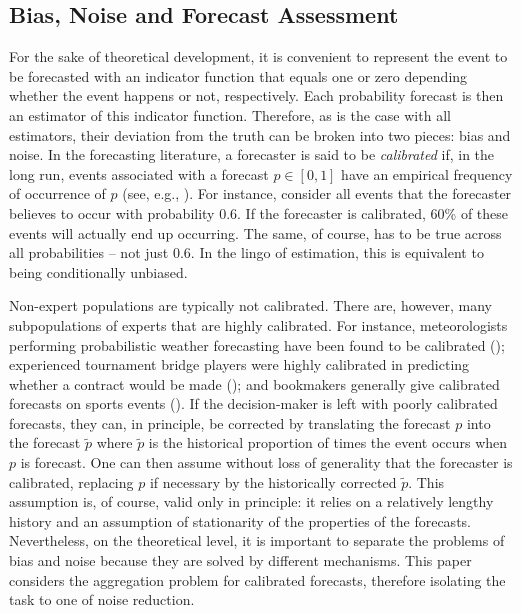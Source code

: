 \documentclass[11pt]{article}
\theoremstyle{definition}
\theoremstyle{definition}
\def\pt{\tilde{p}}
\begin{document}
\subsection{Bias, Noise and Forecast Assessment}
\label{BiasNoise}
For the sake of theoretical development, it is convenient to represent the event to be forecasted with an
indicator function that equals one or zero depending whether the event
happens or not, respectively. Each probability forecast is then an
estimator of this indicator function.  Therefore, as is the case with
all estimators, their deviation from the truth can be broken into two
pieces: bias and noise.  In the forecasting literature, a forecaster
is said to be {\em calibrated} if, in the long run, events associated
with a forecast $p \in [0,1]$ have an empirical frequency of
occurrence of $p$ (see, e.g., \citealt{degroot1983comparison}). For
instance, consider all events that the forecaster believes to occur
with probability 0.6. If the forecaster is calibrated, 60\% of
these events will actually end up occurring. The same, of course, has
to be true across all probabilities -- not just 0.6.  
In the lingo of
estimation, this is equivalent to being conditionally unbiased.

Non-expert populations are typically not calibrated. There are,
however, many subpopulations of experts that are highly
calibrated. For instance, meteorologists performing probabilistic
weather forecasting have been found to be calibrated
(\citealt{murphy1977reliability}); experienced tournament bridge
players were highly calibrated in predicting whether a contract would
be made (\citealt{keren1987facing}); and bookmakers generally give
calibrated forecasts on sports events (\citealt{dowie1976efficiency,
yates1985conditional}). If the decision-maker is left with poorly
calibrated forecasts, they can, in principle, be corrected by
translating the forecast $p$ into the forecast $\pt$ where $\pt$ is
the historical proportion of times the event occurs when $p$ is
forecast.  One can then assume without loss of generality that the
forecaster is calibrated, replacing $p$ if necessary by the
historically corrected $\pt$. This assumption is, of course, valid
only in principle: it relies on a relatively lengthy history and an
assumption of stationarity of the properties of the forecasts.  
Nevertheless, on the
theoretical level, it is important to separate the problems of bias
and noise because they are solved by different mechanisms.  This
paper considers the aggregation problem for calibrated forecasts,
therefore isolating the task to one of noise reduction.
\end{document}
